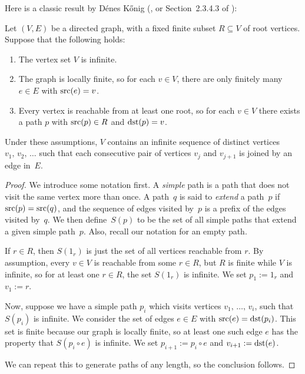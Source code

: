 \documentclass[../generics]{subfiles}
\begin{document}
\pagebreak

Here is a classic result by D\'enes K\H{o}nig (\cite{konig}, or Section~2.3.4.3 of \cite{art1}):

\begin{theorem}\label{infinity lemma}
Let $(V,E)$ be a directed graph, with a fixed finite subset $R\subseteq V$ of root vertices. Suppose that the following holds:
\begin{enumerate}
\item The vertex set $V$ is infinite.
\item The graph is locally finite, so for each $v\in V$, there are only finitely many $e\in E$ with $\operatorname{src}(e)=v$.
\item Every vertex is reachable from at least one root, so for each $v\in V$ there exists a path $p$ with $\operatorname{src}(p)\in R$ and $\operatorname{dst}(p)=v$.
\end{enumerate}
Under these assumptions, $V$ contains an infinite sequence of distinct vertices $v_1,\,v_2,\,\ldots$ such that each consecutive pair of vertices $v_j$ and $v_{j+1}$ is joined by an edge in~$E$.
\end{theorem}
\begin{proof}
We introduce some notation first. A \emph{simple} path is a path that does not visit the same vertex more than once. A path~$q$ is said to \emph{extend} a path~$p$ if $\operatorname{src}(p)=\operatorname{src}(q)$, and the sequence of edges visited by~$p$ is a prefix of the edges visited by~$q$. We then define~$S(p)$ to be the set of all simple paths that extend a given simple path~$p$. Also, recall our notation for an empty path.

If $r\in R$, then $S(1_r)$ is just the set of all vertices reachable from $r$. By assumption, every $v\in V$ is reachable from some $r\in R$, but $R$ is finite while $V$ is infinite, so for at least one $r\in R$, the set $S(1_r)$ is infinite. We set $p_1 := 1_r$ and $v_1 := r$.

Now, suppose we have a simple path $p_i$ which visits vertices $v_1,\,\ldots,\,v_i$, such that $S(p_i)$ is infinite. We consider the set of edges $e\in E$ with $\operatorname{src}(e)=\operatorname{dst}(p_i)$. This set is finite because our graph is locally finite, so at least one such edge $e$ has the property that $S(p_i \circ e)$ is infinite. We set $p_{i+1} := p_i \circ e$ and $v_{i+1} := \operatorname{dst}(e)$.

We can repeat this to generate paths of any length, so the conclusion follows.
\end{proof}
\end{document}
